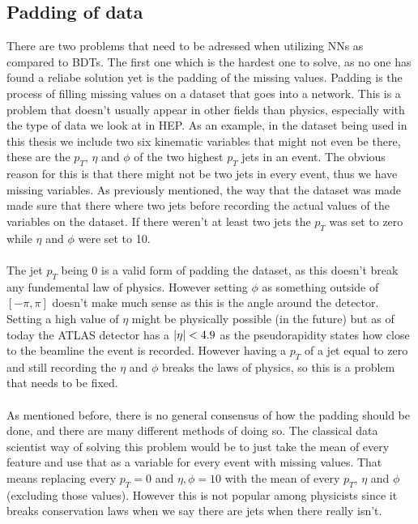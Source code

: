 \documentclass[14pt, a4paper]{book}
\begin{document}
\subsection{Padding of data}\label{sec:padding_NN}
There are two problems that need to be adressed when utilizing NNs as compared to BDTs. The first one which is the hardest one to solve, as no one has found a reliabe solution yet is the padding of the missing values.
Padding is the process of filling missing values on a dataset that goes into a network. This is a problem that doesn't usually appear in other fields than physics, especially with the type of data we look at in HEP.
As an example, in the dataset being used in this thesis we include two six kinematic variables that might not even be there, these are the $p_T$, $\eta$ and $\phi$ of the two highest $p_T$ jets in an event. The obvious reason for this is that there might not be two jets in every event, thus we have missing variables. As previously mentioned, the way that the dataset was made made sure that there where two jets before recording the actual values of the variables on the dataset. If there weren't at least two jets the $p_T$ was set to zero while $\eta$ and $\phi$ were set to 10.\\
\\The jet $p_T$ being 0 is a valid form of padding the dataset, as this doesn't break any fundemental law of physics. However setting $\phi$ as something outside of $[-\pi,\pi]$ doesn't make much sense as this is the angle around the detector. Setting a high value of $\eta$ might be physically possible (in the future) but as of today the ATLAS detector has a $\abs{\eta}<4.9$ as the pseudorapidity states how close to the beamline the event is recorded.
However having a $p_T$ of a jet equal to zero and still recording the $\eta$ and $\phi$ breaks the laws of physics, so this is a problem that needs to be fixed.\\
\\As mentioned before, there is no general consensus of how the padding should be done, and there are many different methods of doing so. The classical data scientist way of solving this problem would be to just take the mean of every feature and use that as a variable for every event with missing values. That means replacing every $p_T = 0$ and $\eta,\phi=10$ with the mean of every $p_T$, $\eta$ and $\phi$ (excluding those values). However this is not popular among physicists since it breaks conservation laws when we say there are jets when there really isn't.
\end{document}
